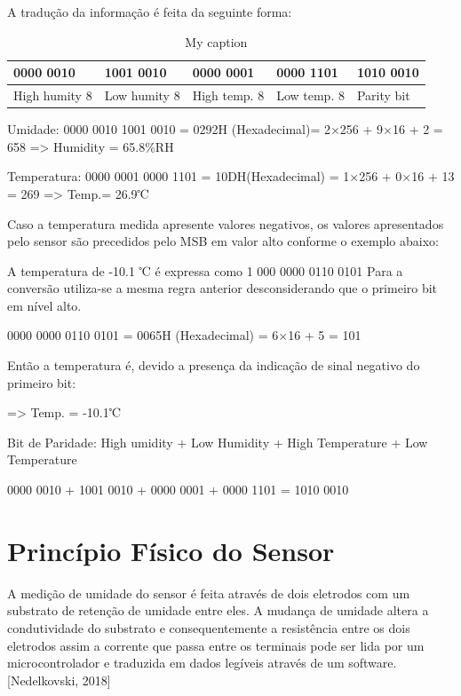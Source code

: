 A tradução da informação é feita da seguinte forma:

\begin{table}[H]
	\centering
	\caption{My caption}
	\label{my-label}
	\begin{tabular}{|l|l|l|l|l|}
		\hline
		{0000 0010} & {1001 0010} & {0000 0001} & {0000 1101} & {1010 0010} \\ \hline
		High humity 8   & Low humity 8    & High temp. 8    & Low temp. 8     & Parity bit      \\ \hline
	\end{tabular}
\end{table}


Umidade: 0000 0010  1001 0010 = 0292H (Hexadecimal)= 2×256 + 9×16 + 2 = 658    => Humidity = 65.8\%RH

Temperatura: 0000 0001  0000 1101 = 10DH(Hexadecimal) = 1×256 + 0×16 + 13 = 269   => Temp.= 26.9℃ 

Caso a temperatura medida apresente valores negativos, os valores apresentados pelo sensor são precedidos pelo MSB em valor alto conforme o exemplo abaixo:

A temperatura de -10.1 ℃ é expressa como 1 000 0000 0110 0101
Para a conversão utiliza-se a mesma regra anterior desconsiderando que o primeiro bit em nível alto.

0000 0000 0110 0101 = 0065H (Hexadecimal) = 6×16 + 5  = 101  

Então a temperatura é, devido a presença da indicação de sinal negativo do primeiro bit:

=> Temp. = -10.1℃ 

Bit de Paridade: High umidity + Low Humidity + High Temperature + Low Temperature

0000 0010 + 1001 0010 + 0000 0001 + 0000 1101 = 1010 0010

\section{Princípio Físico do Sensor}

A medição de umidade do sensor é feita através de dois eletrodos com um substrato de retenção de umidade entre eles. A mudança de umidade altera a condutividade do substrato e consequentemente a resistência entre os dois eletrodos assim a corrente que passa entre os terminais pode ser lida por um microcontrolador e traduzida em dados legíveis através de um software.[Nedelkovski, 2018]

